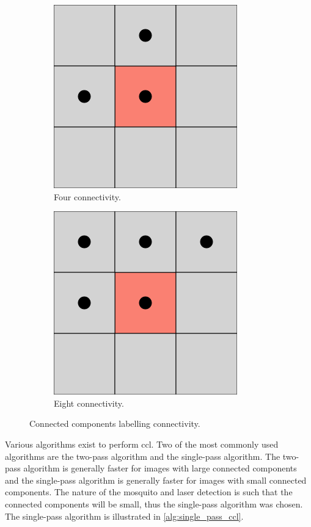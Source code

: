 \begin{figure}[h]
    \centering
    \begin{subfigure}[b]{0.3\textwidth}
        \centering
        \includegraphics[width=0.5\linewidth]{figures/detection/square_4_connectivity.png}
        \caption{Four connectivity.}
        \label{fig:four_connectivity}
    \end{subfigure}
    \quad
    \begin{subfigure}[b]{0.3\textwidth}
        \centering
        \includegraphics[width=0.5\linewidth]{figures/detection/square_8_connectivity.png}
        \caption{Eight connectivity.}
        \label{fig:eight_connectivity}
    \end{subfigure}
    \caption{Connected components labelling connectivity.}
    \label{fig:ccl_connectivity}
\end{figure}

Various algorithms exist to perform \gls{ccl}. Two of the most commonly used algorithms are the two-pass algorithm and the single-pass algorithm. The two-pass algorithm is generally faster for images with large connected components and the single-pass algorithm is generally faster for images with small connected components. The nature of the mosquito and laser detection is such that the connected components will be small, thus the single-pass algorithm was chosen. The single-pass algorithm is illustrated in \autoref{alg:single_pass_ccl}.

